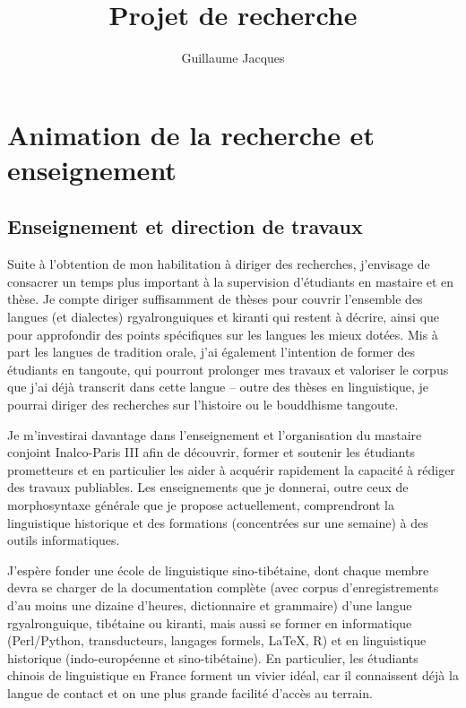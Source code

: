 \documentclass[oldfontcommands,oneside,a4paper,11pt]{article}
\begin{document}
\title{Projet de recherche} 
\author{Guillaume Jacques}
\maketitle

\sloppy
\tableofcontents

\section{Animation de la recherche et enseignement}

\subsection{Enseignement et direction de travaux}
Suite à l'obtention de mon habilitation à diriger des recherches, j'envisage de consacrer un temps plus important à la supervision d'étudiants en mastaire et en thèse. Je compte diriger suffisamment de thèses pour couvrir l'ensemble des langues (et dialectes) rgyalronguiques et kiranti qui restent à décrire, ainsi que pour approfondir des points spécifiques sur les langues les mieux dotées. Mis à part les langues de tradition orale, j'ai également l'intention de former des étudiants en tangoute, qui pourront prolonger mes travaux et valoriser le corpus que j'ai déjà transcrit dans cette langue -- outre des thèses en linguistique, je pourrai diriger des recherches sur l'histoire ou le bouddhisme tangoute.
 
Je m'investirai davantage dans l'enseignement et l'organisation du mastaire conjoint Inalco-Paris III afin de découvrir, former et soutenir les étudiants prometteurs et en particulier les aider à acquérir rapidement la capacité à rédiger des travaux publiables. Les enseignements que je donnerai, outre ceux de morphosyntaxe générale que je propose actuellement, comprendront la linguistique historique et des formations (concentrées sur une semaine) à des outils informatiques.

J'espère  fonder une école de linguistique sino-tibétaine, dont chaque membre devra se charger de la documentation complète (avec corpus d'enregistrements d'au moins une dizaine d'heures, dictionnaire et grammaire) d'une langue rgyalronguique, tibétaine ou  kiranti, mais aussi se former en informatique (Perl/Python, transducteurs, langages formels, \LaTeX, R)  et en linguistique historique (indo-européenne et sino-tibétaine). En particulier, les étudiants chinois de linguistique en France forment un vivier idéal, car il connaissent déjà la langue de contact et on une plus grande facilité d'accès au terrain.
\end{document}
